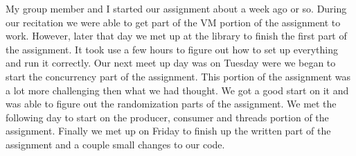 \documentclass[letterpaper,10pt,titlepage]{article}
\begin{document}
My group member and I started our assignment about a week ago or so. During our recitation we were able to get part of the VM portion of the assignment to work. However, later that day we met up at the library to finish the first part of the assignment. It took use a few hours to figure out how to set up everything and run it correctly. Our next meet up day was on Tuesday were we began to start the concurrency part of the assignment. This portion of the assignment was a lot more challenging then what we had thought. We got a good start on it and was able to figure out the randomization parts of the assignment. We met the following day to start on the producer, consumer and threads portion of the assignment. Finally we met up on Friday to finish up the written part of the assignment and a couple small changes to our code.
\end{document}
